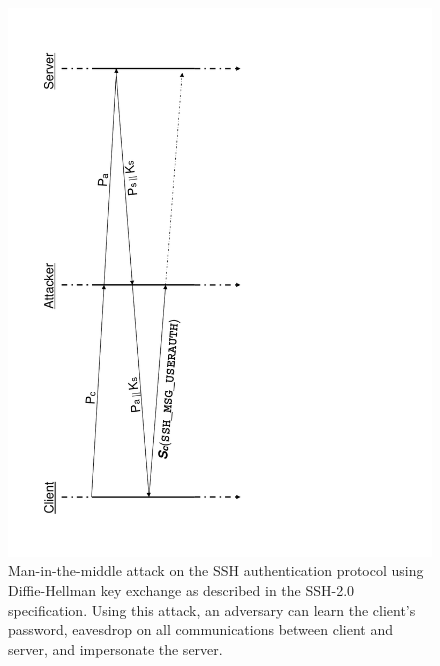 \begin{figure}
  \centering

  \includegraphics[height=\textwidth,keepaspectratio=true,angle=-90]{mitm}
  \vspace{-12em}

  \caption{Man-in-the-middle attack on the SSH authentication protocol
  using Diffie-Hellman key exchange as described in the SSH-2.0
  specification. Using this attack, an adversary can learn the
  client's password, eavesdrop on all communications between client
  and server, and impersonate the server.}
  \label{fig:mitm}
\end{figure}


